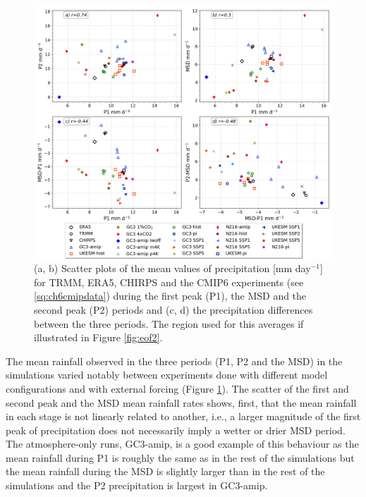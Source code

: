  
 
\label{sq:msdclim}
 \begin{figure}[t!]
\includegraphics[width=\linewidth]{figures/dumscatter_2.png}
\caption[Scatter plot of mean precipitation in different parts of seasonal cycle]{(a, b) Scatter plots of the mean values of precipitation [mm day$^{-1}$] for TRMM, ERA5, CHIRPS and the CMIP6 experiments (see \ref{sq:ch6cmipdata}) during the first peak (P1), the MSD and the second peak (P2) periods and (c, d) the precipitation differences between the three periods. The region used for this averages if illustrated in Figure \ref{fig:eof2}.  
  }
\label{fig:scatter_msd}
\end{figure} 

The mean rainfall observed in the three periods (P1, P2 and the MSD) in the simulations varied notably between experiments done with different model configurations and with external forcing (Figure \ref{fig:scatter_msd}). 
 The scatter of the first and second peak and the MSD mean rainfall rates  shows, first, that the mean rainfall in each stage is not linearly related to another, i.e., a larger magnitude of the first peak of precipitation does not necessarily imply a wetter or drier MSD period. The atmosphere-only runs, GC3-amip, is a good example of this behaviour as the mean rainfall during P1 is roughly the same as in the rest of the simulations but the mean rainfall during the MSD is slightly larger than in the rest of the simulations and the P2 precipitation is largest in GC3-amip. 
 
